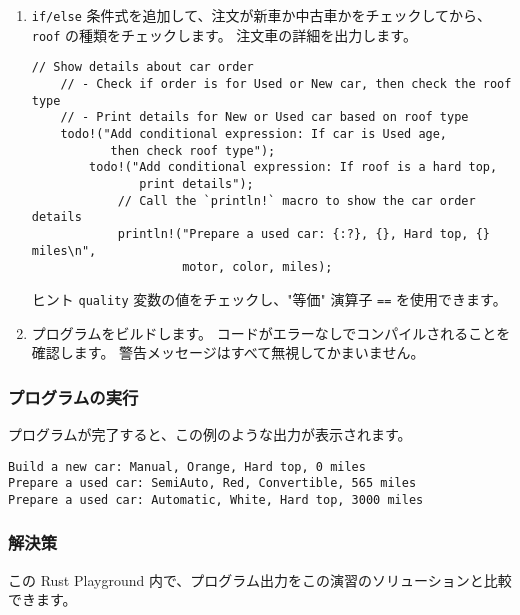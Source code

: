 \begin{enumerate}

\item \texttt{if/else} 条件式を追加して、注文が新車か中古車かをチェックしてから、\texttt{roof} の種類をチェックします。 注文車の詳細を出力します。


\begin{lstlisting}[numbers=none]
    // Show details about car order
    // - Check if order is for Used or New car, then check the roof type 
    // - Print details for New or Used car based on roof type
    todo!("Add conditional expression: If car is Used age,
           then check roof type");
        todo!("Add conditional expression: If roof is a hard top,
               print details");
            // Call the `println!` macro to show the car order details
            println!("Prepare a used car: {:?}, {}, Hard top, {} miles\n",
                     motor, color, miles);                
\end{lstlisting}

\begin{itembox}[l]{ヒント}
\texttt{quality} 変数の値をチェックし、"等価" 演算子 \texttt{==} を使用できます。
\end{itembox}

\item プログラムをビルドします。 コードがエラーなしでコンパイルされることを確認します。 警告メッセージはすべて無視してかまいません。

\end{enumerate}

\subsubsection{プログラムの実行}

プログラムが完了すると、この例のような出力が表示されます。


\begin{lstlisting}[numbers=none]
Build a new car: Manual, Orange, Hard top, 0 miles
Prepare a used car: SemiAuto, Red, Convertible, 565 miles
Prepare a used car: Automatic, White, Hard top, 3000 miles
\end{lstlisting}

\subsubsection{解決策}

この Rust Playground 内で、プログラム出力をこの演習のソリューションと比較できます。

